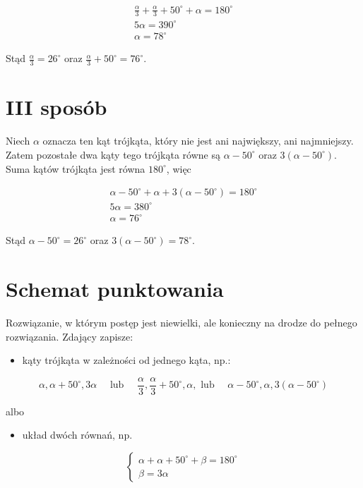 \documentclass[10pt]{article}
\begin{document}
$$
\begin{gathered}
\frac{\alpha}{3}+\frac{\alpha}{3}+50^{\circ}+\alpha=180^{\circ} \\
5 \alpha=390^{\circ} \\
\alpha=78^{\circ}
\end{gathered}
$$

Stąd $\frac{\alpha}{3}=26^{\circ}$ oraz $\frac{\alpha}{3}+50^{\circ}=76^{\circ}$.

\section*{III sposób}
Niech $\alpha$ oznacza ten kąt trójkąta, który nie jest ani największy, ani najmniejszy. Zatem pozostałe dwa kąty tego trójkąta równe są $\alpha-50^{\circ}$ oraz $3\left(\alpha-50^{\circ}\right)$. Suma kątów trójkąta jest równa $180^{\circ}$, więc

$$
\begin{gathered}
\alpha-50^{\circ}+\alpha+3\left(\alpha-50^{\circ}\right)=180^{\circ} \\
5 \alpha=380^{\circ} \\
\alpha=76^{\circ}
\end{gathered}
$$

Stąd $\alpha-50^{\circ}=26^{\circ}$ oraz $3\left(\alpha-50^{\circ}\right)=78^{\circ}$.

\section*{Schemat punktowania}
Rozwiązanie, w którym postęp jest niewielki, ale konieczny na drodze do pełnego rozwiązania. Zdający zapisze:

\begin{itemize}
  \item kąty trójkąta w zależności od jednego kąta, np.:
\end{itemize}

$$
\alpha, \alpha+50^{\circ}, 3 \alpha \quad \text { lub } \quad \frac{\alpha}{3}, \frac{\alpha}{3}+50^{\circ}, \alpha, \text { lub } \quad \alpha-50^{\circ}, \alpha, 3\left(\alpha-50^{\circ}\right)
$$

albo

\begin{itemize}
  \item układ dwóch równań, np.
\end{itemize}

$$
\left\{\begin{array}{l}
\alpha+\alpha+50^{\circ}+\beta=180^{\circ} \\
\beta=3 \alpha
\end{array}\right.
$$
\end{document}

